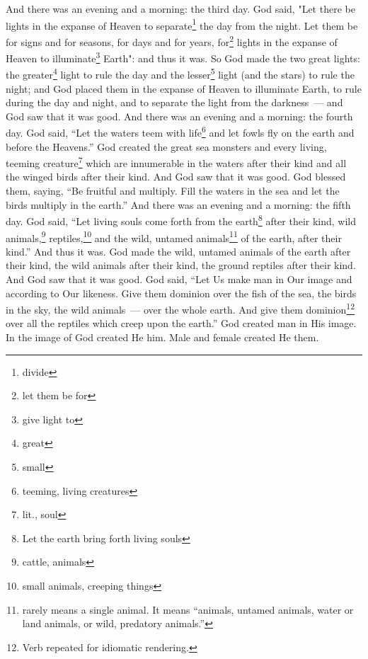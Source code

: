\begin{enumerate}[align=center]
     And there was an evening and a morning: the third day.%
     God said, "Let there be lights in the expanse of Heaven to separate\footnote{divide} the day from the night. Let them be for signs and for seasons, for days and for years,%
     for\footnote{let them be for} lights in the expanse of Heaven to illuminate\footnote{give light to} Earth": and thus it was.%
     So God made the two great lights: the greater\footnote{great} light to rule the day and the lesser\footnote{small} light (and the stars) to rule the night;%
     and God placed them in the expanse of Heaven to illuminate Earth,%
     to rule during the day and night, and to separate the light from the darkness~--- and God saw that it was good.%
     And there was an evening and a morning: the fourth day.%
     God said, ``Let the waters teem with life\footnote{teeming, living creatures} and let fowls fly on the earth and before the Heavens.''%
     God created the great sea monsters and every living, teeming creature\footnote{lit., soul} which are innumerable in the waters after their kind and all the winged birds after their kind. And God saw that it was good.%
     God blessed them, saying, ``Be fruitful and multiply. Fill the waters in the sea and let the birds multiply in the earth.''%
     And there was an evening and a morning: the fifth day.%
     God said, ``Let living souls come forth from the earth\footnote{Let the earth bring forth living souls} after their kind, wild animals,\footnote{cattle, animals} reptiles,\footnote{small animals, creeping things} and the wild, untamed animals\footnote{ rarely means a single animal. It means ``animals, untamed animals, water or land animals, or wild, predatory animals.''} of the earth, after their kind.'' And thus it was.%
     God made the wild, untamed animals of the earth after their kind, the wild animals after their kind, the ground reptiles after their kind. And God saw that it was good.%
     God said, ``Let Us make man in Our image and according to Our likeness. Give them dominion over the fish of the sea, the birds in the sky, the wild animals~--- over the whole earth. And give them dominion\footnote{Verb repeated for idiomatic rendering.} over all the reptiles which creep upon the earth.''%
     God created man in His image. In the image of God created He him. Male and female created He them.%

\end{enumerate}
